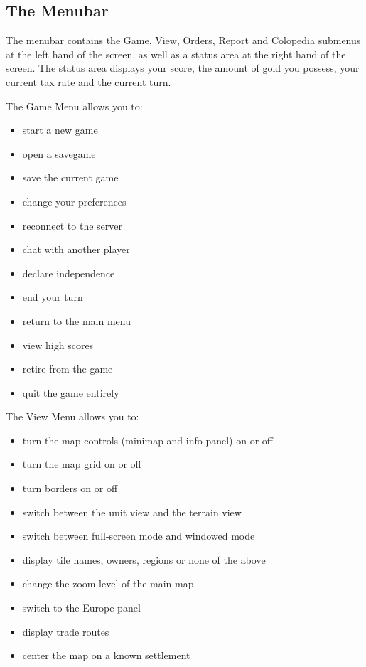 \documentclass[12pt]{book}
\begin{document}
\hypertarget{menubar}{\subsection{The Menubar}}

The menubar contains the Game, View, Orders, Report and Colopedia
submenus at the left hand of the screen, as well as a status area at
the right hand of the screen. The status area displays your score, the
amount of gold you possess, your current tax rate and the current
turn.

The \hypertarget{game menu}{Game Menu} allows you to:

\begin{itemize}
\item start a new game
\item open a savegame
\item save the current game
\item change your preferences
\item reconnect to the server
\item chat with another player
\item declare independence
\item end your turn
\item return to the main menu
\item view high scores
\item retire from the game
\item quit the game entirely
\end{itemize}

The \hypertarget{view menu}{View Menu} allows you to:

\begin{itemize}
\item turn the map controls (minimap and info panel) on or off
\item turn the map grid on or off
\item turn borders on or off
\item switch between the unit view and the terrain view
\item switch between full-screen mode and windowed mode
\item display tile names, owners, regions or none of the above
\item change the zoom level of the main map
\item switch to the Europe panel
\item display trade routes
\item center the map on a known settlement
\end{itemize}
\end{document}
